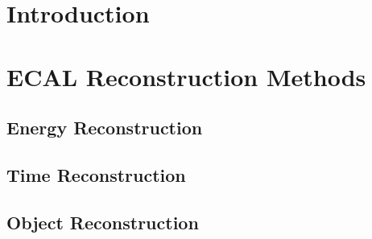 \documentclass{cmspaper}
\begin{document}
\begin{titlepage}
\begin{abstract}


\end{abstract} 

  
\end{titlepage}

\setcounter{page}{2}%
\tableofcontents
\pagebreak
\linenumbers

\section{Introduction \label{sec:intro}}

\FloatBarrier

\section{ECAL Reconstruction Methods \label{sec:reco}}
\subsection{Energy Reconstruction \label{sec:reco1}}

\FloatBarrier
\subsection{Time Reconstruction \label{sec:reco2}}

\FloatBarrier
\subsection{Object Reconstruction \label{sec:reco3}}

\FloatBarrier
\end{document}
